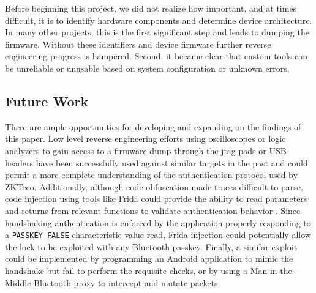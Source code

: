 \documentclass[conference]{IEEEtran}
\begin{document}
Before beginning this project, we did not realize how important, and at times difficult, it is to identify hardware components and determine device architecture. In many other projects, this is the first significant step and leads to dumping the firmware. Without these identifiers and device firmware further reverse engineering progress is hampered. 
Second, it became clear that custom tools can be unreliable or unusable based on system configuration or unknown errors.

\subsection{Future Work}

There are ample opportunities for developing and expanding on the findings of this paper.  Low level reverse engineering efforts using oscilloscopes or logic analyzers to gain access to a firmware dump through the \gls{jtag} pads or USB headers have been successfully used against similar targets in the past \cite{REinIoT}\cite{Barcena2015} and could permit a more complete understanding of the authentication protocol used by ZKTeco.  Additionally, although code obfuscation made traces difficult to parse, code injection using tools like Frida could provide the ability to read parameters and returns from relevant functions to validate authentication behavior \cite{NowSecure}.  Since handshaking authentication is enforced by the application properly responding to a \verb|PASSKEY FALSE| characteristic value read, Frida injection could potentially allow the lock to be exploited with any Bluetooth passkey.  Finally, a similar exploit could be implemented by programming an Android application to mimic the handshake but fail to perform the requisite checks, or by using a Man-in-the-Middle Bluetooth proxy to intercept and mutate packets.

\printbibliography[title={References}]
\end{document}
